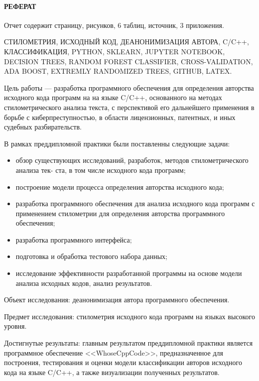 
\newpage
{}
\paragraph{\hfill РЕФЕРАТ \hfill}
Отчет содержит  страницу,  рисунков, 6 таблиц,  источник,
3 приложения.


СТИЛОМЕТРИЯ, ИСХОДНЫЙ КОД, ДЕАНОНИМИЗАЦИЯ АВТОРА, C/C++, КЛАССИФИКАЦИЯ, PYTHON, SKLEARN, JUPYTER NOTEBOOK, DECISION
TREES, RANDOM FOREST CLASSIFIER, CROSS-VALIDATION, ADA BOOST, EXTREMLY RANDOMIZED TREES, GITHUB, LATEX.

Цель работы --- разработка программного обеспечения для определения авторства исходного кода программ
на на языке C/C++, основанного на методах стилометрического анализа текста, с перспективой его
дальнейшего применения в борьбе с киберпреступностью, в области лицензионных, патентных, и иных судебных разбирательств.

В рамках преддипломной практики были поставленны следующие задачи: 
\begin{itemize}
  \item обзор существующих исследований, разработок, методов стилометрического анализа тек-
ста, в том числе исходного кода программ;
\item построение модели процесса определения авторства исходного кода;
  \item разработка программного обеспечения для анализа исходного кода программ с применением стилометрии для
определения авторства программного обеспечения;
  \item разработка программного интерфейса;
  \item подготовка и обработка тестового набора данных;
  \item исследование эффективности разработанной программы на основе модели анализа исходных кодов, анализ результатов.
\end{itemize}

Объект исследования: деанонимизация автора программного обеспечения. 

Предмет исследования: стилометрия исходного кода программ на языках высокого уровня.

Достигнутые результаты: главным результатом преддипломной практики является 
программное обеспечение <<WhoseCppCode>>, предназначенное для построения,
тестирования и оценки модели классификации авторов исходного кода на языке C/C++,
а также визуализации полученных результатов.

